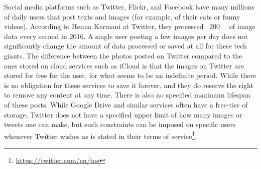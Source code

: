 Social media platforms such as Twitter, Flickr, and Facebook have many millions of daily users that post texts and images (for example, of their cats or funny videos). According to Henna Kermani at Twitter, they processed ~\SI{200}{\giga\byte} of image data every second in 2016\cite{MobileScaleLondona}. A single user posting a few images per day does not significantly change the amount of data processed or saved at all for these tech giants. %
The difference between the photos posted on Twitter compared to the ones stored on cloud services such as iCloud is that the images on Twitter are stored for free for the user, for what seems to be an indefinite period. While there is no obligation for these services to save it forever, and they do reserve the right to remove any content at any time. There is also no specified maximum lifespan of these posts. While Google Drive and similar services often have a free-tier of storage, Twitter does not have a specified upper limit of how many images or tweets one can make, but such constraints can be imposed on specific users whenever Twitter wishes as is stated in their terms of service\footnote{\url{https://twitter.com/en/tos}}.













